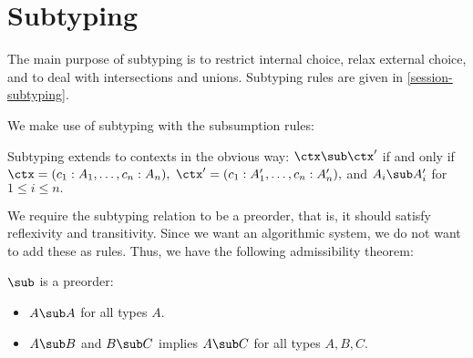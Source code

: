 
\section{Subtyping}

The main purpose of subtyping is to restrict internal choice, relax external choice, and to deal with intersections and unions. Subtyping rules are given in \cref{session-subtyping}.


We make use of subtyping with the subsumption rules:


Subtyping extends to contexts in the obvious way: $\ctx \sub \ctx'$ if and only if $\ctx = (c_1 : A_1, \ldots, c_n : A_n),$ $\ctx' = (c_1 : A_1', \ldots, c_n : A_n'),$ and $A_i \sub A_i'$ for $1 \le i \le n.$

We require the subtyping relation to be a preorder, that is, it should satisfy reflexivity and transitivity. Since we want an algorithmic system, we do not want to add these as rules. Thus, we have the following admissibility theorem:

\begin{theorem}
  $\sub$ is a preorder:
  \begin{itemize}
    \item $A \sub A$ for all types $A.$
    \item $A \sub B$ and $B \sub C$ implies $A \sub C$ for all types $A, B, C.$
  \end{itemize}
\end{theorem}

